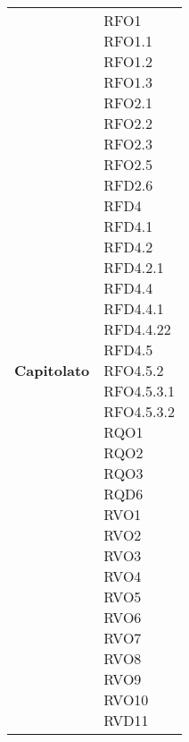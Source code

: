 \begin{longtable}[H]{| >{\centering\bfseries}p{8cm} | >{\centering\arraybackslash}p{8cm} |}
    Capitolato &
        \makecell{
            RFO1 \\
            RFO1.1 \\
            RFO1.2 \\
            RFO1.3 \\
            RFO2.1 \\
            RFO2.2 \\
            RFO2.3 \\
            RFO2.5 \\
            RFD2.6 \\
            RFD4 \\
            RFD4.1 \\
            RFD4.2 \\
            RFD4.2.1 \\
            RFD4.4 \\
            RFD4.4.1 \\
            RFD4.4.22 \\
            RFD4.5 \\
            RFO4.5.2 \\
            RFO4.5.3.1 \\
            RFO4.5.3.2 \\
            RQO1 \\
            RQO2 \\
            RQO3 \\
            RQD6 \\
            RVO1 \\
            RVO2 \\
            RVO3 \\
            RVO4 \\
            RVO5 \\
            RVO6 \\
            RVO7 \\
            RVO8 \\
            RVO9 \\
            RVO10 \\
            RVD11
        } \\


\end{longtable}

